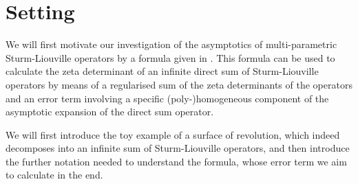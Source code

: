 \section{Setting}
We will first motivate our investigation of the asymptotics of multi-parametric
Sturm-Liouville operators by a formula given in \cite{LV12}. This formula can be
used to calculate the zeta determinant of an infinite direct sum of
Sturm-Liouville operators by means of a regularised sum of the zeta determinants
of the operators and an error term involving a specific (poly-)homogeneous
component of the asymptotic expansion of the direct sum operator.

We will first introduce the toy example of a surface of revolution, which indeed
decomposes into an infinite sum of Sturm-Liouville operators, and then introduce
the further notation needed to understand the formula, whose error term we aim
to calculate in the end.

